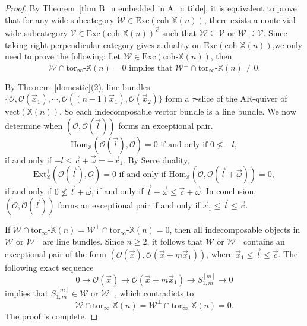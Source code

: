 \documentclass[a4paper, 11pt, reqno]{amsart}
\numberwithin{equation}{section}
\theoremstyle{remark}
\theoremstyle{definition}
\begin{document}
\begin{proof}
   By Theorem~\ref{thm B_n embedded in A_n tilde}, it is equivalent to prove that for any wide subcategory $\mathcal W \in \mathrm{Exc}(\mathrm{coh} \text{-} \mathbb X(n))$, there exists a nontrivial wide subcategory $\mathcal V \in \mathrm{Exc}(\mathrm{coh} \text{-} \mathbb X(n))^{\vec c}$ such that $\mathcal W \subseteq \mathcal V$ or $\mathcal W \supseteq \mathcal V$. Since taking right perpendicular category gives a duality on $\mathrm{Exc}(\mathrm{coh} \text{-} \mathbb X(n))$,we only need to prove the following: Let $\mathcal W \in \mathrm{Exc}(\mathrm{coh} \text{-} \mathbb X(n))$, then 
   \[\mathcal W \cap \mathrm{tor}_{\infty} \text{-} \mathbb X(n)=0 \text{ implies that } \mathcal W^{\perp} \cap \mathrm{tor}_{\infty} \text{-} \mathbb X(n) \neq 0.\]

   By Theorem~\ref{domestic}(2), line bundles $\{\mathcal O, \mathcal O(\vec{x}_1), \cdots, \mathcal{O}((n-1)\vec x_1), \mathcal O(\vec{x}_2)\}$ form a $\tau$-slice of the AR-quiver of $\mathrm{vect}(\mathbb X(n))$. So each indecomposable vector bundle is a line bundle. We now determine when $(\mathcal O, \mathcal O(\vec l))$ forms an exceptional pair. 
   \[
   \mathrm{Hom}_{\mathbb X}(\mathcal O(\vec l), \mathcal O)=0 \text{ if and only if } 0 \nleq -l, 
   \]
   if and only if $-l \leq \vec c+\vec \omega=-\vec x_1$. By Serre duality, 
   \[
      \mathrm{Ext}_{\mathbb X}^1(\mathcal O(\vec l), \mathcal O)=0 \text{ if and only if } \mathrm{Hom}_{\mathbb X}(\mathcal O, \mathcal O(\vec l+\vec \omega))=0,
   \]
   if and only if $0 \nleq \vec l+\vec \omega$, if and only if $\vec l+\vec \omega \leq \vec c+\vec \omega$. In conclusion, $(\mathcal O, \mathcal O(\vec l))$ forms an exceptional pair if and only if $\vec x_1 \leq \vec l \leq \vec c$. 

   If $\mathcal W \cap \mathrm{tor}_{\infty} \text{-} \mathbb X(n)=\mathcal W^{\perp} \cap \mathrm{tor}_{\infty} \text{-} \mathbb X(n)=0$, then all indecomposable objects in $\mathcal W$ or $\mathcal W^{\perp}$ are line bundles. Since $n \geq 2$, it follows that $\mathcal W$ or $\mathcal W^{\perp}$ contains an exceptional pair of the form $(\mathcal O(\vec x), \mathcal O(\vec x+m \vec x_1))$, where $\vec x_1 \leq \vec l \leq \vec c$. The following exact sequence 
   \[
     0 \to \mathcal O(\vec x) \to \mathcal O(\vec x+m\vec x_1) \to S_{1,m}^{[m]} \to 0
   \]
   implies that $S_{1,m}^{[m]} \in \mathcal W \text{ or }\mathcal W^{\perp}$, which contradicts to 
   \[
      \mathcal W \cap \mathrm{tor}_{\infty} \text{-} \mathbb X(n)=\mathcal W^{\perp} \cap \mathrm{tor}_{\infty} \text{-} \mathbb X(n)=0.
   \]
   The proof is complete.
\end{proof}
\end{document}
